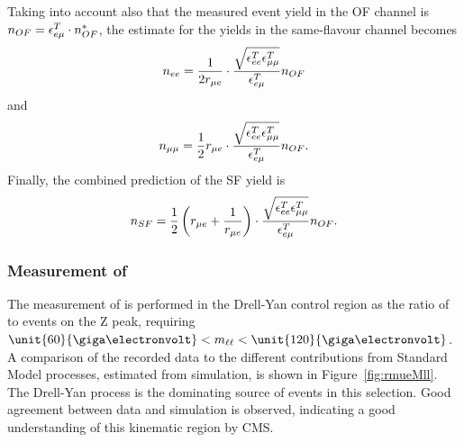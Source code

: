 Taking into account also that the measured event yield in the OF channel is $n_{OF} = \epsilon_{e\mu}^T \cdot n_{OF}^{*}$, the estimate for the yields in the same-flavour channel becomes
\begin{equation}
n_{ee} = \frac{1}{2r_{\mu e}} \cdot \frac{\sqrt{\epsilon_{ee}^T \epsilon_{\mu\mu}^T}}{\epsilon_{e\mu}^T} n_{OF}
\end{equation} 
and
\begin{equation}
n_{\mu\mu} = \frac{1}{2}r_{\mu e}  \cdot \frac{\sqrt{\epsilon_{ee}^T \epsilon_{\mu\mu}^T}}{\epsilon_{e\mu}^T} n_{OF}.
\end{equation} 
Finally, the combined prediction of the SF yield is
\begin{equation}
n_{SF} = \frac{1}{2}\left(r_{\mu e} + \frac{1}{r_{\mu e}}\right) \cdot \frac{\sqrt{\epsilon_{ee}^T \epsilon_{\mu\mu}^T}}{\epsilon_{e\mu}^T}  n_{OF}.
\end{equation}
\subsubsection{Measurement of \rmue}
The measurement of \rmue is performed in the Drell-Yan control region as the ratio of \MM to \EE events on the Z peak, requiring $\unit{60}{\giga\electronvolt} < \mll < \unit{120}{\giga\electronvolt}$. A comparison of the recorded data to the different contributions  from Standard Model processes, estimated from simulation, is shown in Figure~\ref{fig:rmueMll}. The Drell-Yan process is the dominating source of events in this selection. Good agreement between data and simulation is observed, indicating a good understanding of this kinematic region by CMS.   
